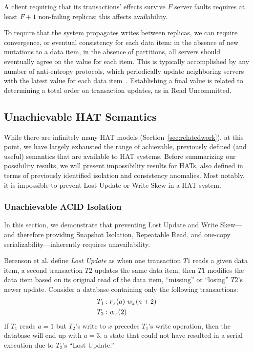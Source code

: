 \vspace{.5em} A client requiring that its
transactions' effects survive $F$ server faults requires at least
$F+1$ non-failing replicas; this affects availability.

\vspace{.5em} To require that the
system propagates writes between replicas, we can require convergence,
or eventual consistency for each data item: in the absence of new
mutations to a data item, in the absence of partitions, all servers
should eventually agree on the value for each item. This is typically
accomplished by any number of anti-entropy protocols, which
periodically update neighboring servers with the latest value for each
data item~\cite{antientropy}. Establishing a final value is related to
determining a total order on transaction updates, as in Read
Uncommitted.

\subsection{Unachievable HAT Semantics}
\label{sec:unachievable-hat}

While there are infinitely many HAT models
(Section~\ref{sec:relatedwork}), at this point, we have largely
exhausted the range of achievable, previously defined (and useful)
semantics that are available to HAT systems. Before summarizing our
possibility results, we will present impossibility results for HATs,
also defined in terms of previously identified isolation and
consistency anomalies. Most notably, it is impossible to
prevent Lost Update or Write Skew in a HAT system.

\subsubsection{Unachievable ACID Isolation}
\label{sec:unachievable-acid}

In this section, we demonstrate that preventing Lost Update and Write
Skew---and therefore providing Snapshot Isolation, Repeatable Read,
and one-copy serializability---inherently requires unavailability.

Berenson et al. define \textit{Lost Update} as when one
transaction $T1$ reads a given data item, a second transaction $T2$
updates the same data item, then $T1$ modifies the data item based on
its original read of the data item, ``missing'' or ``losing'' $T2$'s
newer update. Consider a database containing only the following
transactions:
\begin{align*}
\small\vspace{-1em}
T_1 &: r_x(a)~w_x(a+2)
\\T_2 &: w_x(2)\vspace{-1em}
\end{align*}
If $T_1$ reads $a=1$ but $T_2$'s write to $x$ precedes $T_1$'s write
operation, then the database will end up with $a=3$, a state that
could not have resulted in a serial execution due to $T_2$'s
``Lost Update.''

